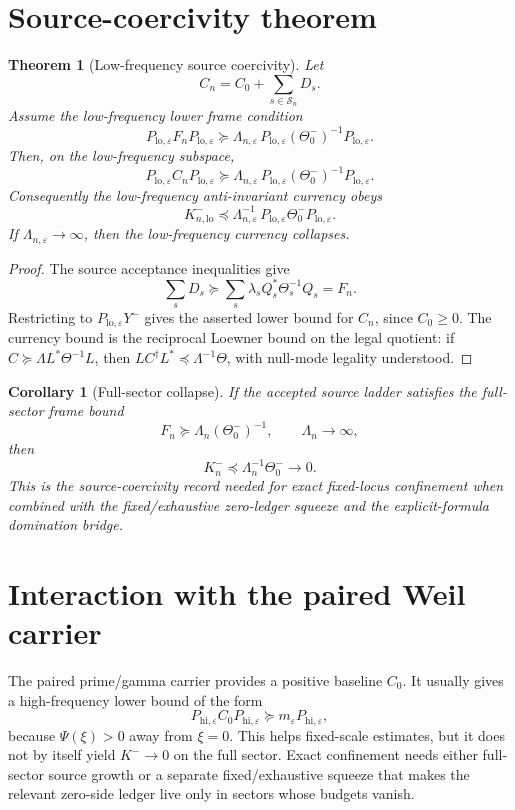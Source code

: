 \documentclass[11pt]{article}
\newtheorem{theorem}{Theorem}
\newtheorem{corollary}{Corollary}
\begin{document}
\section{Source-coercivity theorem}
\begin{theorem}[Low-frequency source coercivity]
Let
\[
C_n=C_0+\sum_{s\in\mathcal S_n}D_s.
\]
Assume the low-frequency lower frame condition
\[
P_{\mathrm{lo},\varepsilon}F_nP_{\mathrm{lo},\varepsilon}
\succeq
\Lambda_{n,\varepsilon}\,P_{\mathrm{lo},\varepsilon}(\Theta_0^-)^{-1}P_{\mathrm{lo},\varepsilon}.
\]
Then, on the low-frequency subspace,
\[
P_{\mathrm{lo},\varepsilon}C_nP_{\mathrm{lo},\varepsilon}
\succeq
\Lambda_{n,\varepsilon}\,P_{\mathrm{lo},\varepsilon}(\Theta_0^-)^{-1}P_{\mathrm{lo},\varepsilon}.
\]
Consequently the low-frequency anti-invariant currency obeys
\[
K^-_{n,\mathrm{lo}}
\preceq
\Lambda_{n,\varepsilon}^{-1}\,P_{\mathrm{lo},\varepsilon}\Theta_0^-P_{\mathrm{lo},\varepsilon}.
\]
If $\Lambda_{n,\varepsilon}\to\infty$, then the low-frequency currency collapses.
\end{theorem}

\begin{proof}
The source acceptance inequalities give
\[
\sum_sD_s\succeq \sum_s\lambda_sQ_s^*\Theta_s^{-1}Q_s=F_n.
\]
Restricting to $P_{\mathrm{lo},\varepsilon}Y^-$ gives the asserted lower bound for $C_n$, since $C_0\ge0$.  The currency bound is the reciprocal Loewner bound on the legal quotient: if $C\succeq \Lambda L^*\Theta^{-1}L$, then $LC^\dagger L^*\preceq \Lambda^{-1}\Theta$, with null-mode legality understood.
\end{proof}

\begin{corollary}[Full-sector collapse]
If the accepted source ladder satisfies the full-sector frame bound
\[
F_n\succeq\Lambda_n(\Theta_0^-)^{-1},\qquad \Lambda_n\to\infty,
\]
then
\[
K_n^-\preceq\Lambda_n^{-1}\Theta_0^-\to0.
\]
This is the source-coercivity record needed for exact fixed-locus confinement when combined with the fixed/exhaustive zero-ledger squeeze and the explicit-formula domination bridge.
\end{corollary}

\section{Interaction with the paired Weil carrier}
The paired prime/gamma carrier provides a positive baseline $C_0$.  It usually gives a high-frequency lower bound of the form
\[
P_{\mathrm{hi},\varepsilon}C_0P_{\mathrm{hi},\varepsilon}\succeq m_\varepsilon P_{\mathrm{hi},\varepsilon},
\]
because $\Psi(\xi)>0$ away from $\xi=0$.  This helps fixed-scale estimates, but it does not by itself yield $K^-\to0$ on the full sector.  Exact confinement needs either full-sector source growth or a separate fixed/exhaustive squeeze that makes the relevant zero-side ledger live only in sectors whose budgets vanish.
\end{document}
